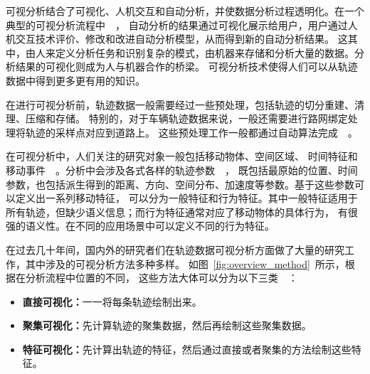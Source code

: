 \documentclass[12pt,twocolumn]{article}
\begin{document}




可视分析结合了可视化、人机交互和自动分析，并使数据分析过程透明化。在一个典型的可视分析流程中~\citep{KeimAFGKM2008}~，
自动分析的结果通过可视化展示给用户，用户通过人机交互技术评价、修改和改进自动分析模型，从而得到新的自动分析结果。
这其中，由人来定义分析任务和识别复杂的模式，由机器来存储和分析大量的数据。分析结果的可视化则成为人与机器合作的桥梁。
可视分析技术使得人们可以从轨迹数据中得到更多更有用的知识。

在进行可视分析前，轨迹数据一般需要经过一些预处理，包括轨迹的切分重建、清理、压缩和存储。
特别的，对于车辆轨迹数据来说，一般还需要进行路网绑定处理将轨迹的采样点对应到道路上。
这些预处理工作一般都通过自动算法完成~\citep{WangLYZW2013,ParentSRAAB2013,ZhengZ2011}~。

在可视分析中，人们关注的研究对象一般包括移动物体、空间区域、
时间特征和移动事件~\citep{AndrienkoABKW2013}~。分析中会涉及各式各样的轨迹参数~\citep{DodgeWL2008}~，
既包括最原始的位置、时间参数，也包括派生得到的距离、方向、空间分布、加速度等参数。基于这些参数可以定义出一系列移动特征，
可以分为一般特征和行为特征。其中一般特征适用于所有轨迹，但缺少语义信息；而行为特征通常对应了移动物体的具体行为，
有很强的语义性。在不同的应用场景中可以定义不同的行为特征。

在过去几十年间，国内外的研究者们在轨迹数据可视分析方面做了大量的研究工作，其中涉及的可视分析方法多种多样。
如图~\ref{fig:overview_method}~所示，根据在分析流程中位置的不同，
这些方法大体可以分为以下三类~\citep{AndrienkoADFW2008}~：

\begin{itemize}
	\item {\bf 直接可视化：}一一将每条轨迹绘制出来。
	\item {\bf 聚集可视化：}先计算轨迹的聚集数据，然后再绘制这些聚集数据。
	\item {\bf 特征可视化：}先计算出轨迹的特征，然后通过直接或者聚集的方法绘制这些特征。
\end{itemize}
\end{document}
